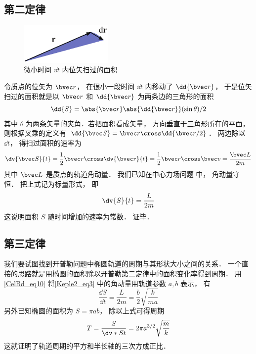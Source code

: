 

\subsection{第二定律}
\begin{figure}[ht]
\centering
\includegraphics[width=4.5cm]{./figures/Keple21.pdf}
\caption{微小时间 $\dd{t}$ 内位矢扫过的面积} \label{Keple2_fig1}
\end{figure}

令质点的位矢为 $\bvec r$，  在很小一段时间 $\dd{t}$ 内移动了 $\dd{\bvec r}$，  于是位矢扫过的面积就是以 $\bvec r$ 和 $\dd{\bvec r}$ 为两条边的三角形的面积
\begin{equation}
\dd{S} = \abs{\bvec r} \abs{\dd{\bvec r}} (\sin \theta) /2
\end{equation}
其中 $\theta$ 为两条矢量的夹角．若把面积看成矢量， 方向垂直于三角形所在的平面， 则根据叉乘的定义有 $\dd{\bvec S} = \bvec r \cross \dd{\bvec r/2}$． 两边除以 $\dd{t}$，  得扫过面积的速率为
\begin{equation}
\dv{\bvec S}{t} = \frac12 \bvec r \cross \dv{\bvec r}{t} = \frac12 \bvec r\cross \bvec v = \frac{\bvec L}{2m}
\end{equation}
其中 $\bvec L$ 是质点的轨道角动量． 我们已知在中心力场问题 中， 角动量守恒． 把上式记为标量形式， 即
\begin{equation}\label{Keple2_eq3}
\dv{S}{t} = \frac{L}{2m}
\end{equation}
这说明面积 $S$ 随时间增加的速率为常数． 证毕．

\subsection{第三定律}
我们要试图找到开普勒问题中椭圆轨道的周期与其形状大小之间的关系． 一个直接的思路就是用椭圆的面积除以开普勒第二定律中的面积变化率得到周期． 用\autoref{CelBd_eq10}  将\autoref{Keple2_eq3} 中的角动量用轨道参数 $a,b$ 表示， 有
\begin{equation}
\frac{\dd{S}}{\dd{t}} = \frac{L}{2m} = \frac b2 \sqrt{\frac{k}{ma}}
\end{equation}
另外已知椭圆的面积为 $S = \pi ab$， 除以上式可得周期
\begin{equation}
T = \frac{S}{\dv*{S}{t}} = 2\pi a^{3/2} \sqrt{\frac mk}
\end{equation}
这就证明了轨道周期的平方和半长轴的三次方成正比．
